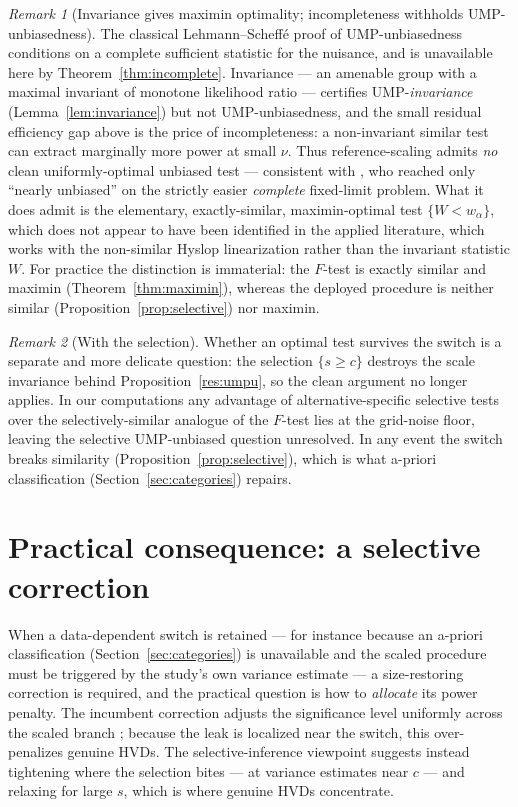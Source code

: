 \documentclass[11pt]{article}
\theoremstyle{remark}
\newtheorem{remark}{Remark}
\begin{document}
\begin{remark}[Invariance gives maximin optimality; incompleteness withholds UMP-unbiasedness]
The classical Lehmann--Scheff\'e proof of UMP-unbiasedness conditions on a complete sufficient statistic for the nuisance, and is unavailable here by Theorem~\ref{thm:incomplete}. Invariance --- an amenable group with a maximal invariant of monotone likelihood ratio --- certifies UMP-\emph{invariance} (Lemma~\ref{lem:invariance}) but not UMP-unbiasedness, and the small residual efficiency gap above is the price of incompleteness: a non-invariant similar test can extract marginally more power at small $\nu$. Thus reference-scaling admits \emph{no} clean uniformly-optimal unbiased test --- consistent with \citet{bhm1997}, who reached only ``nearly unbiased'' on the strictly easier \emph{complete} fixed-limit problem. What it does admit is the elementary, exactly-similar, maximin-optimal test $\{W<w_\alpha\}$, which does not appear to have been identified in the applied literature, which works with the non-similar Hyslop linearization rather than the invariant statistic $W$. For practice the distinction is immaterial: the $F$-test is exactly similar and maximin (Theorem~\ref{thm:maximin}), whereas the deployed procedure is neither similar (Proposition~\ref{prop:selective}) nor maximin.
\end{remark}

\begin{remark}[With the selection]
Whether an optimal test survives the switch is a separate and more delicate question: the selection $\{s\ge c\}$ destroys the scale invariance behind Proposition~\ref{res:umpu}, so the clean argument no longer applies. In our computations any advantage of alternative-specific selective tests over the selectively-similar analogue of the $F$-test lies at the grid-noise floor, leaving the selective UMP-unbiased question unresolved. In any event the switch breaks similarity (Proposition~\ref{prop:selective}), which is what a-priori classification (Section~\ref{sec:categories}) repairs.
\end{remark}

\section{Practical consequence: a selective correction}\label{sec:practical}

When a data-dependent switch is retained --- for instance because an a-priori classification (Section~\ref{sec:categories}) is unavailable and the scaled procedure must be triggered by the study's own variance estimate --- a size-restoring correction is required, and the practical question is how to \emph{allocate} its power penalty. The incumbent correction adjusts the significance level uniformly across the scaled branch \citep{molins2017, ocana2019}; because the leak is localized near the switch, this over-penalizes genuine HVDs. The selective-inference viewpoint suggests instead tightening where the selection bites --- at variance estimates near $c$ --- and relaxing for large $s$, which is where genuine HVDs concentrate.
\end{document}
